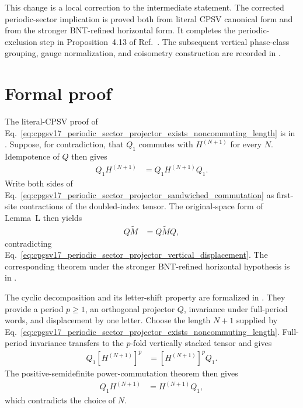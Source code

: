 \documentclass{article}
\begin{document}
This change is a local correction to the intermediate statement. The corrected
periodic-sector implication is proved both from literal CPSV canonical form and
from the stronger BNT-refined horizontal form. It completes the
periodic-exclusion step in Proposition~4.13 of
Ref.~\cite{Cirac2016MPDO_arXiv}. The subsequent vertical phase-class grouping,
gauge normalization, and coisometry construction are recorded in
.

\section{Formal proof}

The literal-CPSV proof of
Eq.~\ref{eq:cpgsv17_periodic_sector_projector_exists_noncommuting_length} is
 in
. Suppose, for contradiction,
that $Q_1$ commutes with $H^{(N+1)}$ for every $N$. Idempotence of $Q$ then
gives
\begin{align}
    Q_1H^{(N+1)}
        &=Q_1H^{(N+1)}Q_1.
    \label{eq:cpgsv17_periodic_sector_projector_sandwiched_commutation}
\end{align}
Write both sides of
Eq.~\ref{eq:cpgsv17_periodic_sector_projector_sandwiched_commutation} as
first-site contractions of the doubled-index tensor. The original-space form
of Lemma~L then yields
\begin{align}
    Q\widetilde M
        &=Q\widetilde M Q,
    \label{eq:cpgsv17_periodic_sector_projector_lemma_l_invariance}
\end{align}
contradicting
Eq.~\ref{eq:cpgsv17_periodic_sector_projector_vertical_displacement}. The
corresponding theorem under the stronger BNT-refined horizontal
hypothesis is
 in
.

The cyclic decomposition and its letter-shift property are formalized in
. They provide a period $p\geq1$,
an orthogonal projector $Q$, invariance under full-period words, and
displacement by one letter. Choose the length $N+1$ supplied by
Eq.~\ref{eq:cpgsv17_periodic_sector_projector_exists_noncommuting_length}.
Full-period invariance transfers to the $p$-fold vertically stacked tensor and
gives
\begin{align}
    Q_1[H^{(N+1)}]^p
        &=[H^{(N+1)}]^pQ_1.
    \label{eq:cpgsv17_periodic_sector_projector_witness_power_commutation}
\end{align}
The positive-semidefinite power-commutation theorem then gives
\begin{align}
    Q_1H^{(N+1)}
        &=H^{(N+1)}Q_1,
    \label{eq:cpgsv17_periodic_sector_projector_witness_commutation}
\end{align}
which contradicts the choice of $N$.
\end{document}
